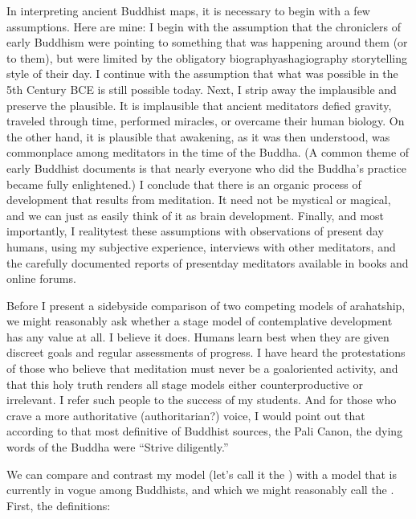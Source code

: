\documentclass[a5paper,10pt,english]{book}
\begin{document}
\sphinxAtStartPar
In interpreting ancient Buddhist maps, it is necessary to begin with a
few assumptions. Here are mine: I begin with the assumption that the
chroniclers of early Buddhism were pointing to something that was
happening around them (or to them), but were limited by the obligatory
biography\sphinxhyphen{}as\sphinxhyphen{}hagiography storytelling style of their day. I continue
with the assumption that what was possible in the 5th Century BCE is
still possible today. Next, I strip away the implausible and preserve
the plausible. It is implausible that ancient meditators defied gravity,
traveled through time, performed miracles, or overcame their human
biology. On the other hand, it is plausible that awakening, as it was
then understood, was commonplace among meditators in the time of the
Buddha. (A common theme of early Buddhist documents is that nearly
everyone who did the Buddha’s practice became fully enlightened.) I
conclude that there is an organic process of development that results
from meditation. It need not be mystical or magical, and we can just as
easily think of it as brain development. Finally, and most importantly,
I reality\sphinxhyphen{}test these assumptions with observations of present day
humans, using my subjective experience, interviews with other
meditators, and the carefully documented reports of present\sphinxhyphen{}day
meditators available in books and online forums.

\sphinxAtStartPar
Before I present a side\sphinxhyphen{}by\sphinxhyphen{}side comparison of two competing models of
arahatship, we might reasonably ask whether a stage model of
contemplative development has any value at all. I believe it does.
Humans learn best when they are given discreet goals and regular
assessments of progress. I have heard the protestations of those who
believe that meditation must never be a goal\sphinxhyphen{}oriented activity, and that
this holy truth renders all stage models either counterproductive or
irrelevant. I refer such people to the success of my students. And for
those who crave a more authoritative (authoritarian?) voice, I would
point out that according to that most definitive of Buddhist sources,
the Pali Canon, the dying words of the Buddha were “Strive diligently.”

\sphinxAtStartPar
We can compare and contrast my model (let’s call it the ) with a model that is currently in vogue among Buddhists, and
which we might reasonably call the . First, the
definitions:
\end{document}
